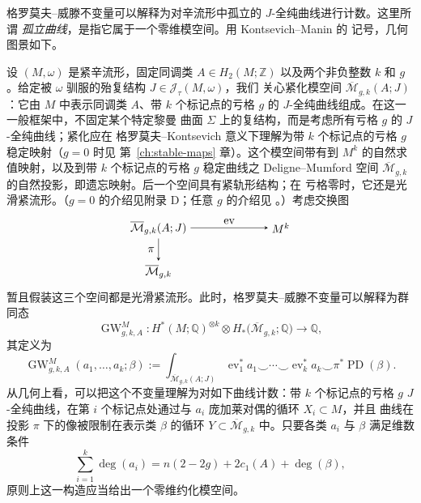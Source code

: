 
格罗莫夫--威滕不变量可以解释为对辛流形中孤立的 $J$-全纯曲线进行计数。这里所谓
\emph{孤立曲线}，是指它属于一个零维模空间。用 Kontsevich--Manin  的
记号，几何图景如下。

设 $(M,\omega)$ 是紧辛流形，固定同调类 $A\in H_2(M;\mathbb Z)$ 以及两个非负整数
$k$ 和 $g$。给定被 $\omega$ 驯服的殆复结构 $J\in\mathcal J_\tau(M,\omega)$，我们
关心紧化模空间 $\overline{\mathcal M}_{g,k}(A;J)$：它由 $M$ 中表示同调类 $A$、带
$k$ 个标记点的亏格 $g$ 的 $J$-全纯曲线组成。在这一一般框架中，不固定某个特定黎曼
曲面 $\Sigma$ 上的复结构，而是考虑所有亏格 $g$ 的 $J$-全纯曲线；紧化应在
格罗莫夫--Kontsevich 意义下理解为带 $k$ 个标记点的亏格 $g$ 稳定映射（$g=0$ 时见
第~\ref{ch:stable-maps} 章）。这个模空间带有到 $M^k$ 的自然求值映射，以及到带 $k$
个标记点的亏格 $g$ 稳定曲线之 Deligne--Mumford 空间
$\overline{\mathcal M}_{g,k}$ 的自然投影，即遗忘映射。后一个空间具有紧轨形结构；在
亏格零时，它还是光滑紧流形。（$g=0$ 的介绍见附录 D；任意 $g$ 的介绍见
。）考虑交换图
\[
\begin{tikzpicture}[baseline=(current bounding box.center),>=stealth]
  \node (mod) at (0,0) {$\overline{\mathcal M}_{g,k}(A;J)$};
  \node (mk) at (3.8,0) {$M^k$};
  \node (dm) at (0,-1.35) {$\overline{\mathcal M}_{g,k}$};
  \draw[->] (mod) -- node[above] {$\operatorname{ev}$} (mk);
  \draw[->] (mod) -- node[left] {$\pi$} (dm);
\end{tikzpicture}
\]
暂且假装这三个空间都是光滑紧流形。此时，格罗莫夫--威滕不变量可以解释为群同态
\[
  \operatorname{GW}^{M}_{g,k,A}:
  H^*(M;\mathbb Q)^{\otimes k}\otimes
  H_*\bigl(\overline{\mathcal M}_{g,k};\mathbb Q\bigr)
  \longrightarrow\mathbb Q,
\]
其定义为
\[
  \operatorname{GW}^{M}_{g,k,A}(a_1,\ldots,a_k;\beta)
  :=\int_{\overline{\mathcal M}_{g,k}(A;J)}
  \operatorname{ev}_1^*a_1\smile\cdots\smile
  \operatorname{ev}_k^*a_k\smile\pi^*\operatorname{PD}(\beta).
\]
从几何上看，可以把这个不变量理解为对如下曲线计数：带 $k$ 个标记点的亏格 $g$
$J$-全纯曲线，在第 $i$ 个标记点处通过与 $a_i$ 庞加莱对偶的循环 $X_i\subset M$，并且
曲线在投影 $\pi$ 下的像被限制在表示类 $\beta$ 的循环
$Y\subset\overline{\mathcal M}_{g,k}$ 中。只要各类 $a_i$ 与 $\beta$ 满足维数条件
\[
  \sum_{i=1}^k\deg(a_i)
  =n(2-2g)+2c_1(A)+\deg(\beta),
\]
原则上这一构造应当给出一个零维约化模空间。

